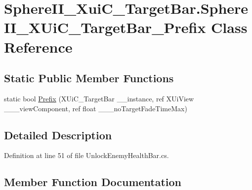 \hypertarget{class_sphere_i_i___xui_c___target_bar_1_1_sphere_i_i___x_ui_c___target_bar___prefix}{}\section{Sphere\+I\+I\+\_\+\+Xui\+C\+\_\+\+Target\+Bar.\+Sphere\+I\+I\+\_\+\+X\+Ui\+C\+\_\+\+Target\+Bar\+\_\+\+Prefix Class Reference}
\label{class_sphere_i_i___xui_c___target_bar_1_1_sphere_i_i___x_ui_c___target_bar___prefix}
\subsection*{Static Public Member Functions}
\begin{DoxyCompactItemize}
\item 
static bool \mbox{\hyperlink{class_sphere_i_i___xui_c___target_bar_1_1_sphere_i_i___x_ui_c___target_bar___prefix_a9060cf9d8dccf3ea08578f860c313ade}{Prefix}} (X\+Ui\+C\+\_\+\+Target\+Bar \+\_\+\+\_\+instance, ref X\+Ui\+View \+\_\+\+\_\+\+\_\+view\+Component, ref float \+\_\+\+\_\+\+\_\+no\+Target\+Fade\+Time\+Max)
\end{DoxyCompactItemize}


\subsection{Detailed Description}


Definition at line 51 of file Unlock\+Enemy\+Health\+Bar.\+cs.



\subsection{Member Function Documentation}
\mbox{\label{class_sphere_i_i___xui_c___target_bar_1_1_sphere_i_i___x_ui_c___target_bar___prefix_a9060cf9d8dccf3ea08578f860c313ade}} 
